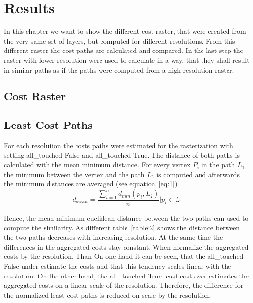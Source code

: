 \documentclass[acmtog]{acmart}
\begin{document}
	\section{Results}
	In this chapter we want to show the different cost raster, that were created from the very same set of layers,
	but computed for different resolutions.
	From this different raster the cost paths are calculated and compared.
	In the last step the raster with lower resolution were used to calculate in a way, that they shall result in
	similar paths as if the paths were computed from a high resolution raster.
	\subsection{Cost Raster}
	\subsection{Least Cost Paths}
	For each resolution the costs paths were estimated for the rasterization with setting all\_touched False
	and all\_touched True.
	The distance of both paths is calculated with the mean minimum distance.
	For every vertex $P_i$ in the path $L_1$ the minimum between the vertex and the path $L_2$
	is computed and afterwards the minimum distances are averaged (see equation~\ref{eq:1}).
	\begin{equation}
		\label{eq:1}
		d_{mean} = \frac{\sum_{i=1}^{n} d_{min}(p_i, L_2)}{n} \bigg\vert p_i \in L_1
	\end{equation}

	Hence, the mean minimum euclidean distance between the two paths can used to compute
	the similarity.
	As different table~\ref{table:2} shows the distance between the two paths decreases
	with increasing resolution.
	At the same time the differences in the aggregated costs stay constant.
	 When normalize the aggregated costs by the resolution.
	Than On one hand it can be seen, that the all\_touched False under estimate the costs and that this tendency scales
	linear with the resolution.
	On the other hand, the all\_touched True least cost over estimates the aggregated costs on a linear scale of
	the resolution.
	Therefore, the difference for the normalized least cost paths is reduced on scale by the resolution.
	
\end{document}
